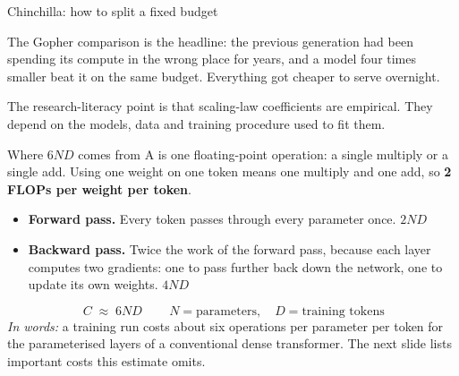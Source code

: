 \documentclass[aspectratio=169,10pt]{beamer}
\begin{document}
\begin{frame}[shrink=5]{Chinchilla: how to split a fixed budget}
{  The Gopher comparison is the headline: the previous generation had been
  spending its compute in the wrong place for years, and a model four times
  smaller beat it on the same budget. Everything got cheaper to serve
  overnight.

  The research-literacy point is that scaling-law coefficients are empirical.
  They depend on the models, data and training procedure used to fit them.}
\end{frame}

\begin{frame}{Where $6ND$ comes from}
  A  is one floating-point operation: a single multiply or a single
  add. Using one weight on one token means one multiply and one add, so
  \textbf{2 FLOPs per weight per token}.
  \vspace{0.5em}
  \begin{itemize}
    \item \textbf{Forward pass.} Every token passes through every parameter
      once. \hfill $2ND$
      \vspace{0.4em}
    \item \textbf{Backward pass.} Twice the work of the forward pass, because
      each layer computes two gradients: one to pass further back down the
      network, one to update its own weights. \hfill $4ND$
  \end{itemize}
  \vspace{0.5em}
  \[ \boxed{\,C \;\approx\; 6 N D\,} \qquad
     N = \text{parameters}, \quad D = \text{training tokens} \]
  \emph{In words:} a training run costs about six operations per parameter per
  token for the parameterised layers of a conventional dense transformer. The
  next slide lists important costs this estimate omits.
\end{frame}
\end{document}
